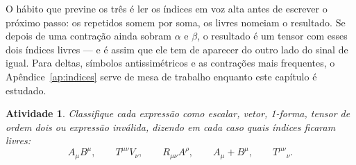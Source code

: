 \documentclass[12pt,a4paper,oneside]{book}
\theoremstyle{rgplain}
\newtheorem{activity}{Atividade}[chapter]
\theoremstyle{rgremark}
\begin{document}
O hábito que previne os três é ler os índices em voz alta antes de escrever o
próximo passo: os repetidos somem por soma, os livres nomeiam o resultado. Se
depois de uma contração ainda sobram $\alpha$ e $\beta$, o resultado é um
tensor com esses dois índices livres --- e é assim que ele tem de aparecer do
outro lado do sinal de igual. Para deltas, símbolos antissimétricos e as
contrações mais frequentes, o Apêndice~\ref{ap:indices} serve de mesa de
trabalho enquanto este capítulo é estudado.

\begin{activity}
Classifique cada expressão como escalar, vetor, 1-forma, tensor de ordem dois
ou expressão inválida, dizendo em cada caso quais índices ficaram livres:
\[
  A_\mu B^\mu,\qquad
  T^{\mu\nu}V_\nu,\qquad
  R_{\mu\nu}A^\rho,\qquad
  A_\mu+B^\mu,\qquad
  T^{\mu\nu}{}_{\nu}.
\]
\end{activity}

\clearpage
{}
{}
\label{sec:interludio-tessera}
\end{document}
